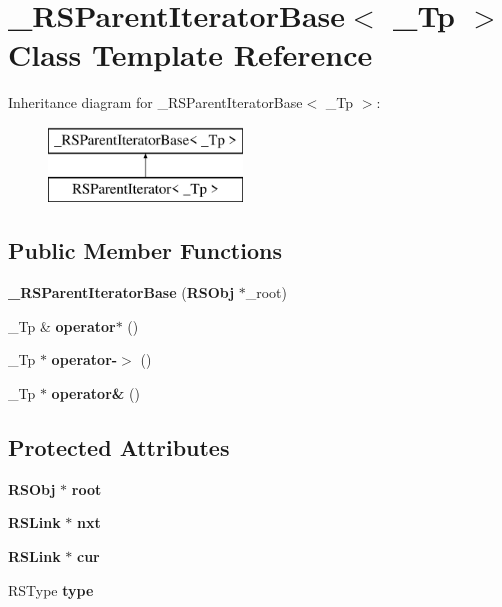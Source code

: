 \section{\-\_\-\-R\-S\-Parent\-Iterator\-Base$<$ \-\_\-\-Tp $>$ Class Template Reference}
\label{class__RSParentIteratorBase}
Inheritance diagram for \-\_\-\-R\-S\-Parent\-Iterator\-Base$<$ \-\_\-\-Tp $>$\-:\begin{figure}[H]
\begin{center}
\leavevmode
\includegraphics[height=2.000000cm]{class__RSParentIteratorBase}
\end{center}
\end{figure}
\subsection*{Public Member Functions}
\begin{DoxyCompactItemize}
\item 
{\bfseries \-\_\-\-R\-S\-Parent\-Iterator\-Base} ({\bf R\-S\-Obj} $\ast$\-\_\-root)\label{class__RSParentIteratorBase_a8d94f20fa8429a0d2fb71cff51687af0}

\item 
\-\_\-\-Tp \& {\bfseries operator$\ast$} ()\label{class__RSParentIteratorBase_a1c2f4e14e17c6cbde822b8b5443340ff}

\item 
\-\_\-\-Tp $\ast$ {\bfseries operator-\/$>$} ()\label{class__RSParentIteratorBase_a6d9145b0e1e626999790890171a58cb4}

\item 
\-\_\-\-Tp $\ast$ {\bfseries operator\&} ()\label{class__RSParentIteratorBase_a1a1ca787bb7f8ba776ef0f23792c6485}

\end{DoxyCompactItemize}
\subsection*{Protected Attributes}
\begin{DoxyCompactItemize}
\item 
{\bf R\-S\-Obj} $\ast$ {\bfseries root}\label{class__RSParentIteratorBase_ac1bd28e65d3b9777a9f16cdee00b7b6e}

\item 
{\bf R\-S\-Link} $\ast$ {\bfseries nxt}\label{class__RSParentIteratorBase_a71bbd4437d43e17760315c6178757bbc}

\item 
{\bf R\-S\-Link} $\ast$ {\bfseries cur}\label{class__RSParentIteratorBase_a20edc033cc73d5b7c5eb962fc32c78e5}

\item 
R\-S\-Type {\bfseries type}\label{class__RSParentIteratorBase_a93a2da9e38fa9a9e8a207f131b3b6149}

\end{DoxyCompactItemize}


